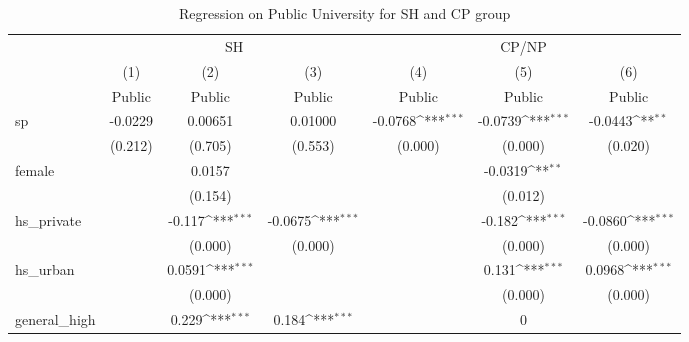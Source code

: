 \documentclass[]{AEA}
\def\sym#1{\ifmmode^{#1}\else\(^{#1}\)\fi}
\begin{document}
    \begin{center}
    \begin{table}
    \caption{Regression on Public University for SH and CP group}
    \setlength{\tabcolsep}{0.5mm}
    \begin{tabular}{l*{6}c}
    \toprule
    &\multicolumn{3}{c}{SH} &\multicolumn{3}{c}{CP/NP} \\
    \cmidrule(l){2-4}\cmidrule(l){5-7}
    &\multicolumn{1}{c}{(1)}&\multicolumn{1}{c}{(2)}&\multicolumn{1}{c}{(3)}&\multicolumn{1}{c}{(4)}&\multicolumn{1}{c}{(5)}&\multicolumn{1}{c}{(6)} \\
    &\multicolumn{1}{c}{Public}&\multicolumn{1}{c}{Public}&\multicolumn{1}{c}{Public}&\multicolumn{1}{c}{Public}&\multicolumn{1}{c}{Public}&\multicolumn{1}{c}{Public} \\
    \midrule
    sp          &     -0.0229         &     0.00651         &     0.01000         &     -0.0768\sym{***}&     -0.0739\sym{***}&     -0.0443\sym{**} \\
            &     (0.212)         &     (0.705)         &     (0.553)         &     (0.000)         &     (0.000)         &     (0.020)         \\
    [1em]
    female      &                     &      0.0157         &                     &                     &     -0.0319\sym{**} &                     \\
                &                     &     (0.154)         &                     &                     &     (0.012)         &                     \\
    [1em]
    hs\_private  &                     &      -0.117\sym{***}&     -0.0675\sym{***}&                     &      -0.182\sym{***}&     -0.0860\sym{***}\\
                &                     &     (0.000)         &     (0.000)         &                     &     (0.000)         &     (0.000)         \\
    [1em]
    hs\_urban    &                     &      0.0591\sym{***}&                     &                     &       0.131\sym{***}&      0.0968\sym{***}\\
                &                     &     (0.000)         &                     &                     &     (0.000)         &     (0.000)         \\
    [1em]
    general\_high&                     &       0.229\sym{***}&       0.184\sym{***}&                     &           0         &                     \\

\end{tabular}
\end{table}
\end{center}
\end{document}
